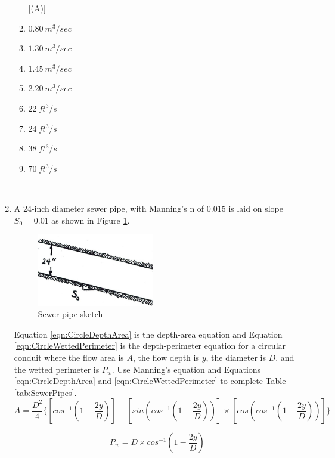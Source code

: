 \documentclass[11pt]{article}
\begin{document}
\begin{enumerate}
\begin{enumerate} [(A)]
\item $0.80~ m^3/sec$
\item $1.30~ m^3/sec$
\item $1.45~ m^3/sec$
\item $2.20~ m^3/sec$
\item $22~ft^3/s$
\item $24~ft^3/s$
\item $38~ft^3/s$
\item $70~ft^3/s$
\end{enumerate}
~\newline
\item A 24-inch diameter sewer pipe, with Manning's n of $0.015$ is laid on slope $S_0 =0.01$ as shown in Figure \ref{fig:PipeOnSlope}.    

\begin{figure}[h!] %
\centering
   \includegraphics[width=2in]{PipeOnSlope.jpg}
   \caption{Sewer pipe sketch}
   \label{fig:PipeOnSlope} 
\end{figure}
Equation \ref{eqn:CircleDepthArea} is the depth-area equation  and Equation \ref{eqn:CircleWettedPerimeter} is the depth-perimeter equation for a circular conduit where the flow area is $A$, the flow depth is $y$, the diameter is $D$.
and the wetted perimeter is $P_w$.  Use Manning's equation and Equations \ref{eqn:CircleDepthArea} and \ref{eqn:CircleWettedPerimeter}  to complete Table \ref{tab:SewerPipes}.
\begin{equation}
A = \frac{D^2}{4} \{ [cos^{-1}(1-\frac{2y}{D})] - [sin(cos^{-1}(1-\frac{2y}{D}))] \times [cos(cos^{-1}(1-\frac{2y}{D}))] \}
\label{eqn:CircleDepthArea}
\end{equation}

\begin{equation}
P_w = D \times cos^{-1}(1-\frac{2y}{D})
\label{eqn:CircleWettedPerimeter} 
\end{equation}


\end{enumerate}
\end{document}
